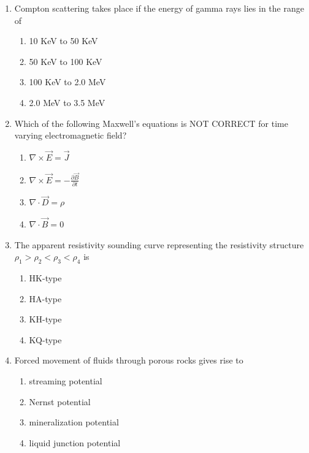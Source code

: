 \documentclass[journal,12pt,onecolumn]{IEEEtran}
\theoremstyle{remark}
\begin{document}
\begin{enumerate}
\item Compton scattering takes place if the energy of gamma rays lies in the range of  
\begin{enumerate}
\item 10 KeV to 50 KeV  
\item 50 KeV to 100 KeV  
\item 100 KeV to 2.0 MeV  
\item 2.0 MeV to 3.5 MeV  
\end{enumerate}

\item Which of the following Maxwell's equations is NOT CORRECT for time varying electromagnetic field?  
\begin{multicols}{2}
\begin{enumerate}
\item \(\nabla \times \vec{E} = \vec{J}\)  
\item \(\nabla \times \vec{E} = -\frac{\partial \vec{B}}{\partial t}\)  
\item \(\nabla \cdot \vec{D} = \rho\)  
\item \(\nabla \cdot \vec{B} = 0\)  
\end{enumerate}
\end{multicols}

\item The apparent resistivity sounding curve representing the resistivity structure \(\rho_1 > \rho_2 < \rho_3 < \rho_4\) is  
\begin{multicols}{2}
\begin{enumerate}
\item HK-type  
\item HA-type  
\item KH-type  
\item KQ-type  
\end{enumerate}
\end{multicols}

\item Forced movement of fluids through porous rocks gives rise to  
\begin{multicols}{2}
\begin{enumerate}
\item streaming potential  
\item Nernst potential  
\item mineralization potential  
\item liquid junction potential  
\end{enumerate}
\end{multicols}







\end{enumerate}
\end{document}
